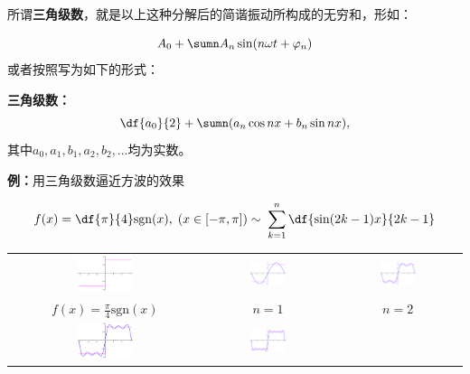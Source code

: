 所谓{\bf 三角级数}，就是以上这种分解后的简谐振动所构成的无穷和，形如：

$$A_0+\sumn A_n\sin(n\omega t+\varphi_n)$$
或者按照写为如下的形式：
\begin{thx}
	{\bf 三角级数：}
	$${\df{a_0}{2}+\sumn(a_n\cos nx+b_n\sin nx)},$$
	其中$a_0,a_1,b_1,a_2,b_2,\ldots$均为实数。
\end{thx}

{\bf 例：}用三角级数逼近方波的效果

$${f(x)=\df{\pi}{4}\mathrm{sgn}(x),\;(x\in[-\pi,\pi])
\;{\sim\;\sum\limits_{k=1}^n\df{\sin(2k-1)x}{2k-1}}}$$

\begin{center}
	\begin{tabular}{ccc}
		\includegraphics[width=0.3\textwidth]{./images/ch13/fsgn/f0.pdf} &
		\includegraphics[width=0.3\textwidth]{./images/ch13/fsgn/f1.pdf} &
		\includegraphics[width=0.3\textwidth]{./images/ch13/fsgn/f2.pdf} \\
		$f(x)=\frac{\pi}4\mathrm{sgn}(x)$ & $n=1$ & $n=2$\\[1em]
		\includegraphics[width=0.3\textwidth]{./images/ch13/fsgn/f3.pdf} &
		\includegraphics[width=0.3\textwidth]{./images/ch13/fsgn/f4.pdf} &

\end{tabular}
\end{center}
